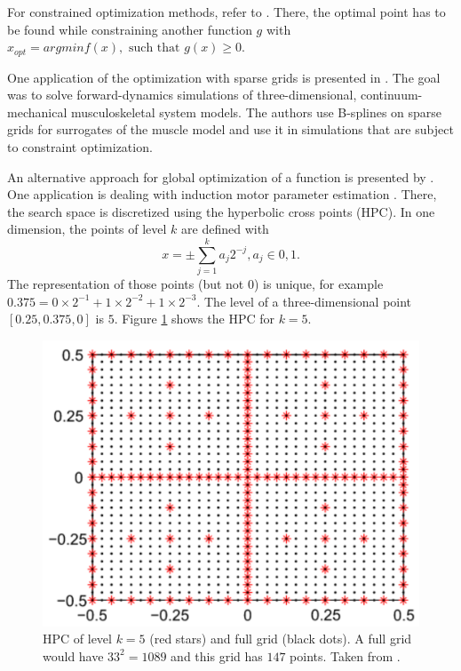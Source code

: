For constrained optimization methods, refer to \cite{b_splines}. There, the optimal point has to be found while constraining another function $ g $ with $ x_{opt} = arg min f(x), \text{ such that } g(x) \ge 0 $. 
\newline 

One application of the optimization with sparse grids is presented in \cite{valentin2018gradient}. The goal was to solve forward-dynamics simulations of three-dimensional, continuum-mechanical musculoskeletal system models. The authors use B-splines on sparse grids for surrogates of the muscle model and use it in simulations that are subject to constraint optimization. 
\newline 

An alternative approach for global optimization of a function is presented by \cite{novak1996global}. One application is dealing with induction motor parameter estimation \cite{duan2016induction}. There, the search space is discretized using the hyperbolic cross points (HPC). In one dimension, the points of level $ k $ are defined with 
\begin{equation}
	x = \pm \sum_{j=1}^{k} a_j 2^{-j}, a_j \in {0,1}.
\end{equation}
The representation of those points (but not $ 0 $) is unique, for example $ 0.375 = 0 \times 2^{-1} + 1 \times 2^{-2} + 1 \times 2 ^{-3} $. The level of a three-dimensional point $ [0.25, 0.375, 0] $ is $ 5 $. Figure \ref{fig:hyperbolic} shows the HPC for $ k = 5 $.

\begin{figure}[ht]
	\centering
	\includegraphics[scale=0.18]{figures/hyperbolic.png}
	\caption{ HPC of level $ k = 5 $ (red stars) and full grid (black dots). A full grid would have $ 33^2 = 1089 $ and this grid has $ 147 $ points. Taken from \cite{duan2016induction}.}
	\label{fig:hyperbolic}
\end{figure}

